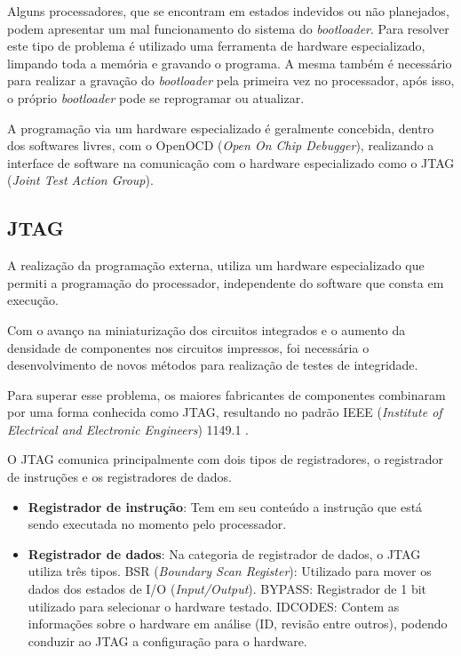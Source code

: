 


Alguns processadores, que se encontram em estados indevidos ou não planejados, podem apresentar um mal funcionamento do sistema do \textit{bootloader}. Para resolver este tipo de problema é utilizado uma ferramenta de hardware especializado, limpando toda a memória e gravando o programa. A mesma também é necessário para realizar a gravação do \textit{bootloader} pela primeira vez no processador, após isso, o próprio \textit{bootloader} pode se reprogramar ou atualizar.

A programação via um hardware especializado é geralmente concebida, dentro dos softwares livres, com o OpenOCD (\textit{Open On Chip Debugger})\cite{openocd}, realizando a interface de software na comunicação com o hardware especializado como o JTAG (\textit{Joint Test Action Group}).


\subsection{JTAG}
A realização da programação externa, utiliza um hardware especializado que permiti a programação do processador, independente do software que consta em execução.

Com o avanço na miniaturização dos circuitos integrados e o aumento da densidade de componentes nos circuitos impressos, foi necessária o desenvolvimento de novos métodos para realização de testes de integridade.

Para superar esse problema, os maiores fabricantes de componentes combinaram por uma forma conhecida como JTAG, resultando no padrão IEEE (\textit{Institute of Electrical and Electronic Engineers}) 1149.1 \cite{jtagcite}.

O JTAG comunica principalmente com dois tipos de registradores, o registrador de instruções e os registradores de dados.

\begin{itemize}
\item \textbf{Registrador de instrução}: Tem em seu conteúdo a instrução que está sendo executada no momento pelo processador.
\item \textbf{Registrador de dados}: Na categoria de registrador de dados, o JTAG utiliza três tipos.
\subitem BSR (\textit{Boundary Scan Register}): Utilizado para mover os dados dos estados de I/O (\textit{Input/Output}).
\subitem BYPASS: Registrador de 1 bit utilizado para selecionar o hardware testado.
\subitem IDCODES: Contem as informações sobre o hardware em análise (ID, revisão entre outros), podendo conduzir ao JTAG a configuração para o hardware.
\end{itemize}

